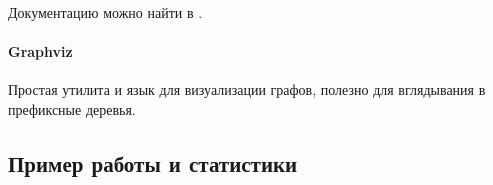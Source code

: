Документацию можно найти в \cite{python:dammit}.

\paragraph{ Graphviz } Простая утилита и язык для визуализации графов, полезно для вглядывания в префиксные деревья.

\subsection{ Пример работы и статистики }

